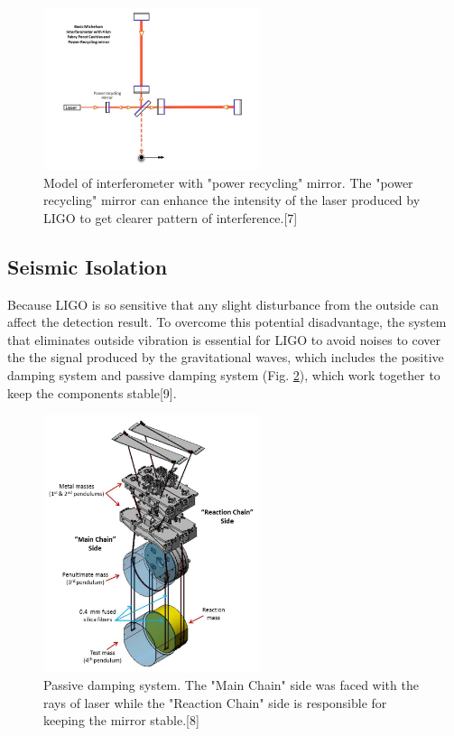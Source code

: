 \documentclass[journal,comsoc,twoside]{IEEEtran}
\begin{document}
\begin{figure}[!t]
\centering
\includegraphics[width=2.5in]{PowerRecyclingMirror.png}
\caption{Model of interferometer with "power recycling" mirror. The "power recycling" mirror can enhance the intensity of the laser produced by LIGO to get clearer pattern of interference.[7]}
\label{PowerRecyclingMirror}
\end{figure}
\subsection{Seismic Isolation}
Because LIGO is so sensitive that any slight disturbance from the outside can affect the detection result. To overcome this potential disadvantage, the system that eliminates outside vibration is essential for LIGO to avoid noises to cover the the signal produced by the gravitational waves, which includes the positive damping system and passive damping system (Fig. \ref{Quad}), which work together to keep the components stable[9].

\begin{figure}[!t]
\centering
\includegraphics[width=2.5in]{Quad.png}
\caption{Passive damping system. The "Main Chain" side was faced with the rays of laser while the "Reaction Chain" side is responsible for keeping the mirror stable.[8]}
\label{Quad}
\end{figure}
\end{document}
